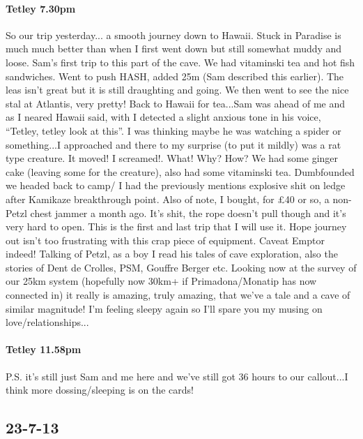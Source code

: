 \paragraph{Tetley 7.30pm}

So our trip yesterday... a smooth journey down to Hawaii. Stuck in Paradise is much much better than when I first went down but still somewhat muddy and loose. Sam’s first trip to this part of the cave. We had vitaminski tea and hot fish sandwiches. Went to push HASH, added 25m (Sam described this earlier). The leas isn’t great but it is still draughting and going. We then went to see the nice stal at Atlantis, very pretty! Back to Hawaii for tea...Sam was ahead of me and as I neared Hawaii said, with I detected a slight anxious tone in his voice, “Tetley, tetley look at this”. I was thinking maybe he was watching a spider or something...I approached and there to my surprise (to put it mildly) was a rat type creature. It moved! I screamed!. What! Why? How? We had some ginger cake (leaving some for the creature), also had some vitaminski tea. Dumbfounded we headed back to camp/ I had the previously mentions explosive shit on ledge after Kamikaze breakthrough point. Also of note, I bought, for £40 or so, a non-Petzl chest jammer a month ago. It’s shit, the rope doesn't pull though and it’s very hard to open. This is the first and last trip that I will use it. Hope journey out isn’t too frustrating with this crap piece of equipment. Caveat Emptor indeed! Talking of Petzl, as a boy I read his tales of cave exploration, also the stories of Dent de Crolles, PSM, Gouffre Berger etc. Looking now at the survey of our 25km system (hopefully now 30km+ if Primadona/Monatip has now connected in) it really is amazing, truly amazing, that we’ve a tale and a cave of similar magnitude!
I’m feeling sleepy again so I’ll spare you my musing on love/relationships...






\paragraph{Tetley 11.58pm}
P.S. it’s still just Sam and me here and we’ve still got 36 hours to our callout...I think more dossing/sleeping is on the cards!


\subsection{23-7-13}


